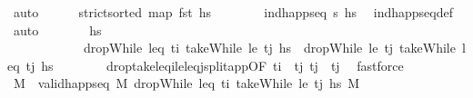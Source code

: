 \begin{isabellebody}
\ auto\isanewline
\ \ \ \ \isamarkupfalse%
\ {\isachardoublequoteopen}strict{\isacharunderscore}{\kern0pt}sorted\ {\isacharparenleft}{\kern0pt}map\ fst\ hs{\isacharparenright}{\kern0pt}{\isachardoublequoteclose}\isanewline
\ \ \ \ \ \ \isamarkupfalse%
\ {\isacartoucheopen}ind{\isacharunderscore}{\kern0pt}happ{\isacharunderscore}{\kern0pt}seq\ {\isasympi}s\ hs{\isacartoucheclose}\ \isamarkupfalse%
\ ind{\isacharunderscore}{\kern0pt}happ{\isacharunderscore}{\kern0pt}seq{\isacharunderscore}{\kern0pt}def\ \isamarkupfalse%
\ auto\isanewline
\ \ \ \ \isamarkupfalse%
\ \isamarkupfalse%
\ {\isachardoublequoteopen}{\isacharquery}{\kern0pt}hs{\isacharprime}{\kern0pt}\ \isanewline
\ \ \ \ \ \ \ \ \ \ \ {\isacharequal}{\kern0pt}\ dropWhile\ {\isacharparenleft}{\kern0pt}leq\ t\isactrlsub i{\isacharparenright}{\kern0pt}\ {\isacharparenleft}{\kern0pt}takeWhile\ {\isacharparenleft}{\kern0pt}le\ t\isactrlsub j{\isacharparenright}{\kern0pt}\ hs{\isacharparenright}{\kern0pt}\ {\isacharat}{\kern0pt}\ dropWhile\ {\isacharparenleft}{\kern0pt}le\ t\isactrlsub j{\isacharparenright}{\kern0pt}\ {\isacharparenleft}{\kern0pt}takeWhile\ {\isacharparenleft}{\kern0pt}leq\ t\isactrlsub j{\isacharparenright}{\kern0pt}\ hs{\isacharparenright}{\kern0pt}{\isachardoublequoteclose}\isanewline
\ \ \ \ \ \ \isamarkupfalse%
\ drop{\isacharunderscore}{\kern0pt}take{\isacharunderscore}{\kern0pt}leq\isactrlsub i{\isacharunderscore}{\kern0pt}le{\isacharunderscore}{\kern0pt}leq\isactrlsub j{\isacharunderscore}{\kern0pt}split{\isacharunderscore}{\kern0pt}app{\isacharbrackleft}{\kern0pt}OF\ {\isacartoucheopen}t\isactrlsub i\ {\isacharless}{\kern0pt}\ t\isactrlsub j{\isacartoucheclose}\ {\isacartoucheopen}t\isactrlsub j\ {\isasymle}\ t\isactrlsub j{\isacartoucheclose}{\isacharbrackright}{\kern0pt}\ \isamarkupfalse%
\ fastforce\isanewline
\ \ \ \ \isamarkupfalse%
\ \isamarkupfalse%
\ M{\isacharprime}{\kern0pt}{\isacharprime}{\kern0pt}\ \ {\isachardoublequoteopen}valid{\isacharunderscore}{\kern0pt}happ{\isacharunderscore}{\kern0pt}seq\ M\ {\isacharparenleft}{\kern0pt}dropWhile\ {\isacharparenleft}{\kern0pt}leq\ t\isactrlsub i{\isacharparenright}{\kern0pt}\ {\isacharparenleft}{\kern0pt}takeWhile\ {\isacharparenleft}{\kern0pt}le\ t\isactrlsub j{\isacharparenright}{\kern0pt}\ hs{\isacharparenright}{\kern0pt}{\isacharparenright}{\kern0pt}\ M{\isacharprime}{\kern0pt}{\isacharprime}{\kern0pt}{\isachardoublequoteclose}\ \isanewline

\end{isabellebody}
